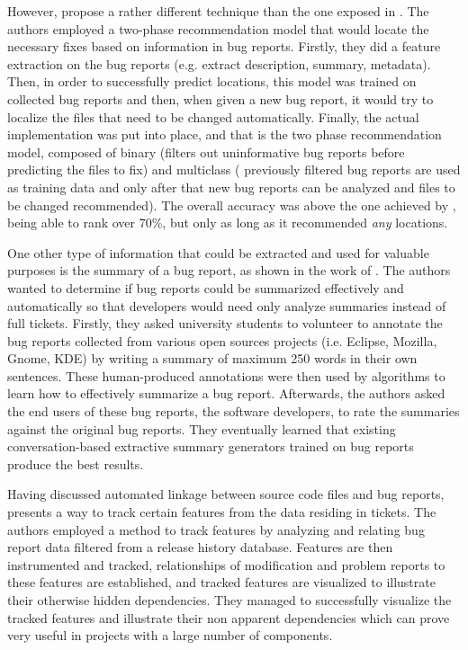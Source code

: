 \documentclass[11pt,english,twocolumn]{article}
\begin{document}
However, \cite{kim2013should} propose a rather different technique than the one
exposed in \cite{bettenburg2012using}. The authors employed a two-phase
recommendation model that would locate the necessary fixes based on information
in bug reports. Firstly, they did a feature extraction on the bug reports (e.g. 
extract description, summary, metadata). Then, in order to successfully predict
locations, this model was trained on collected bug reports and then, when given
a new bug report, it would try to localize the files that need to be changed 
automatically. Finally, the actual implementation was put into place, and that
is the two phase recommendation model, composed of binary (filters out 
uninformative bug reports before predicting the files to fix) and multiclass (
previously filtered bug reports are used as training data and only after that
new bug reports can be analyzed and files to be changed recommended). The 
overall accuracy was above the one achieved by \cite{bettenburg2012using}, 
being able to rank over 70\%, but only as long as it recommended \emph{any} 
locations.

One other type of information that could be extracted and used for valuable
purposes is the summary of a bug report, as shown in the work of 
\cite{rastkar2010summarizing}. The authors wanted to determine if bug reports
could be summarized effectively and automatically so that developers would
need only analyze summaries instead of full tickets. Firstly, they asked
university students to volunteer to annotate the bug reports collected from
various open sources projects (i.e. Eclipse, Mozilla, Gnome, KDE) by writing
a summary of maximum 250 words in their own sentences. These human-produced 
annotations were then used by algorithms to learn how to effectively summarize a 
bug report.  Afterwards, the authors asked the end users of these bug reports, the 
software developers, to rate the summaries against the original bug reports.
They eventually learned that existing conversation-based extractive summary
generators trained on bug reports produce the best results.

Having discussed automated linkage between source code files and bug reports, 
\cite{fischer2003analyzing} presents a way to track certain features from the
data residing in tickets. The authors employed a method to track features by 
analyzing and relating bug report data filtered from a release history database.
Features are then instrumented and tracked, relationships of modification and 
problem reports to these features are established, and tracked features are
visualized to illustrate their otherwise hidden dependencies. They managed to 
successfully visualize the tracked features and illustrate their non apparent
dependencies which can prove very useful in projects with a large number of
components.
\end{document}
